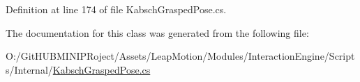 Definition at line 174 of file Kabsch\+Grasped\+Pose.\+cs.



The documentation for this class was generated from the following file\+:\begin{DoxyCompactItemize}
\item 
O\+:/\+Git\+H\+U\+B\+M\+I\+N\+I\+P\+Roject/\+Assets/\+Leap\+Motion/\+Modules/\+Interaction\+Engine/\+Scripts/\+Internal/\mbox{\hyperlink{_kabsch_grasped_pose_8cs}{Kabsch\+Grasped\+Pose.\+cs}}\end{DoxyCompactItemize}
